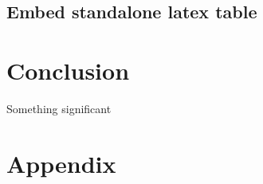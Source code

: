 \documentclass[12pt,]{article}
\begin{document}
\subsection{Embed standalone latex
table}\label{embed-standalone-latex-table}

\vspace{5mm}  \vspace{5mm}

\section{Conclusion}\label{conclusion}

Something significant

\section{Appendix}\label{appendix}




\newpage
\singlespacing
\renewcommand{\mkbibnamefamily}[1]{\textsc{#1}}
\printbibliography[title=Bibliography]
\end{document}
